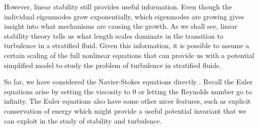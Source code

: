 However, linear stability still provides useful information. Even though the individual eigenmodes grow exponentially, which eigenmodes are growing gives insight into what mechanisms are causing the growth. As we shall see, linear stability theory tells us what length scales dominate in the transition to turbulence in a stratified fluid. Given this information, it is possible to assume a certain scaling of the full nonlinear equations that can provide us with a potential simplified model to study the problem of turbulence in stratified fluids. 

So far, we have considered the Navier-Stokes equations directly . Recall the Euler equations arise by setting the viscosity to $0$ or letting the Reynolds number go to infinity. The Euler equations also have some other nicer features, such as explicit conservation of energy which might provide a useful potential invariant that we can exploit in the study of stability and turbulence. 

